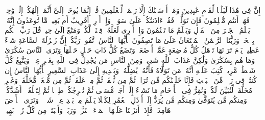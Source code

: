 \stopbuffer%
\startbuffer[\q:21:106]
إِنَّ فِی هَٰذَا لَبَلَٰغࣰا لِّقَوۡمٍ عَٰبِدِینَ%
\stopbuffer%
\startbuffer[\q:21:107]
وَمَاۤ أَرۡسَلۡنَٰكَ إِلَّا رَحۡمَةࣰ لِّلۡعَٰلَمِینَ%
\stopbuffer%
\startbuffer[\q:21:108]
قُلۡ إِنَّمَا یُوحَىٰۤ إِلَیَّ أَنَّمَاۤ إِلَٰهُكُمۡ إِلَٰهࣱ وَٰحِدࣱۖ فَهَلۡ أَنتُم مُّسۡلِمُونَ%
\stopbuffer%
\startbuffer[\q:21:109]
فَإِن تَوَلَّوۡا۟ فَقُلۡ ءَاذَنتُكُمۡ عَلَىٰ سَوَاۤءࣲۖ وَإِنۡ أَدۡرِیۤ أَقَرِیبٌ أَم بَعِیدࣱ مَّا تُوعَدُونَ%
\stopbuffer%
\startbuffer[\q:21:110]
إِنَّهُۥ یَعۡلَمُ ٱلۡجَهۡرَ مِنَ ٱلۡقَوۡلِ وَیَعۡلَمُ مَا تَكۡتُمُونَ%
\stopbuffer%
\startbuffer[\q:21:111]
وَإِنۡ أَدۡرِی لَعَلَّهُۥ فِتۡنَةࣱ لَّكُمۡ وَمَتَٰعٌ إِلَىٰ حِینࣲ%
\stopbuffer%
\startbuffer[\q:21:112]
قَٰلَ رَبِّ ٱحۡكُم بِٱلۡحَقِّۗ وَرَبُّنَا ٱلرَّحۡمَٰنُ ٱلۡمُسۡتَعَانُ عَلَىٰ مَا تَصِفُونَ%
\stopbuffer%
\startbuffer[\q:22:1]
یَٰۤأَیُّهَا ٱلنَّاسُ ٱتَّقُوا۟ رَبَّكُمۡۚ إِنَّ زَلۡزَلَةَ ٱلسَّاعَةِ شَیۡءٌ عَظِیمࣱ%
\stopbuffer%
\startbuffer[\q:22:2]
یَوۡمَ تَرَوۡنَهَا تَذۡهَلُ كُلُّ مُرۡضِعَةٍ عَمَّاۤ أَرۡضَعَتۡ وَتَضَعُ كُلُّ ذَاتِ حَمۡلٍ حَمۡلَهَا وَتَرَى ٱلنَّاسَ سُكَٰرَىٰ وَمَا هُم بِسُكَٰرَىٰ وَلَٰكِنَّ عَذَابَ ٱللَّهِ شَدِیدࣱ%
\stopbuffer%
\startbuffer[\q:22:3]
وَمِنَ ٱلنَّاسِ مَن یُجَٰدِلُ فِی ٱللَّهِ بِغَیۡرِ عِلۡمࣲ وَیَتَّبِعُ كُلَّ شَیۡطَٰنࣲ مَّرِیدࣲ%
\stopbuffer%
\startbuffer[\q:22:4]
كُتِبَ عَلَیۡهِ أَنَّهُۥ مَن تَوَلَّاهُ فَأَنَّهُۥ یُضِلُّهُۥ وَیَهۡدِیهِ إِلَىٰ عَذَابِ ٱلسَّعِیرِ%
\stopbuffer%
\startbuffer[\q:22:5]
یَٰۤأَیُّهَا ٱلنَّاسُ إِن كُنتُمۡ فِی رَیۡبࣲ مِّنَ ٱلۡبَعۡثِ فَإِنَّا خَلَقۡنَٰكُم مِّن تُرَابࣲ ثُمَّ مِن نُّطۡفَةࣲ ثُمَّ مِنۡ عَلَقَةࣲ ثُمَّ مِن مُّضۡغَةࣲ مُّخَلَّقَةࣲ وَغَیۡرِ مُخَلَّقَةࣲ لِّنُبَیِّنَ لَكُمۡۚ وَنُقِرُّ فِی ٱلۡأَرۡحَامِ مَا نَشَاۤءُ إِلَىٰۤ أَجَلࣲ مُّسَمࣰّى ثُمَّ نُخۡرِجُكُمۡ طِفۡلࣰا ثُمَّ لِتَبۡلُغُوۤا۟ أَشُدَّكُمۡۖ وَمِنكُم مَّن یُتَوَفَّىٰ وَمِنكُم مَّن یُرَدُّ إِلَىٰۤ أَرۡذَلِ ٱلۡعُمُرِ لِكَیۡلَا یَعۡلَمَ مِنۢ بَعۡدِ عِلۡمࣲ شَیۡءࣰاۚ وَتَرَى ٱلۡأَرۡضَ هَامِدَةࣰ فَإِذَاۤ أَنزَلۡنَا عَلَیۡهَا ٱلۡمَاۤءَ ٱهۡتَزَّتۡ وَرَبَتۡ وَأَنۢبَتَتۡ مِن كُلِّ زَوۡجِۭ بَهِیجࣲ%
\stopbuffer%
